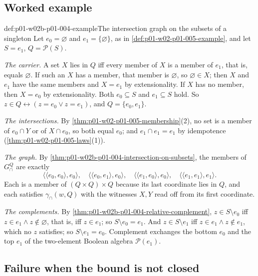 \subsection{Worked example}
\label{sec:p01-w02b-p01-004-example}

\begin{hbexample}{def:p01-w02b-p01-004-example}{The intersection graph on the subsets of a singleton}
Let \(e_0=\varnothing\) and \(e_1=\{\varnothing\}\), as in
\cref{def:p01-w02-p01-005-example}, and let \(S=e_1\), \(Q=\mathcal P(S)\).

\emph{The carrier.} A set \(X\) lies in \(Q\) iff every member of \(X\) is a
member of \(e_1\), that is, equals \(\varnothing\). If such an \(X\) has a
member, that member is \(\varnothing\), so \(\varnothing\in X\); then \(X\) and
\(e_1\) have the same members and \(X=e_1\) by extensionality. If \(X\) has no
member, then \(X=e_0\) by extensionality. Both \(e_0\subseteq S\) and
\(e_1\subseteq S\) hold. So \(z\in Q\leftrightarrow(z=e_0\lor z=e_1)\), and
\(Q=\{e_0,e_1\}\).

\emph{The intersections.} By \cref{thm:p01-w02-p01-005-membership}(2), no set
is a member of \(e_0\cap Y\) or of \(X\cap e_0\), so both equal \(e_0\); and
\(e_1\cap e_1=e_1\) by idempotence (\cref{thm:p01-w02-p01-005-laws}(1)).

\emph{The graph.} By \cref{thm:p01-w02b-p01-004-intersection-on-subsets}, the
members of \(G^{Q}_{\cap}\) are exactly
\[
  \langle\langle e_0,e_0\rangle,e_0\rangle,\quad
  \langle\langle e_0,e_1\rangle,e_0\rangle,\quad
  \langle\langle e_1,e_0\rangle,e_0\rangle,\quad
  \langle\langle e_1,e_1\rangle,e_1\rangle .
\]
Each is a member of \((Q\times Q)\times Q\) because its last coordinate lies in
\(Q\), and each satisfies \(\gamma_{\cap}(w,Q)\) with the witnesses \(X,Y\)
read off from its first coordinate.

\emph{The complements.} By \cref{thm:p01-w02b-p01-004-relative-complement},
\(z\in S\setminus e_0\) iff \(z\in e_1\land z\notin\varnothing\), that is, iff
\(z\in e_1\); so \(S\setminus e_0=e_1\). And \(z\in S\setminus e_1\) iff
\(z\in e_1\land z\notin e_1\), which no \(z\) satisfies; so
\(S\setminus e_1=e_0\). Complement exchanges the bottom \(e_0\) and the top
\(e_1\) of the two-element Boolean algebra \(\mathcal P(e_1)\).
\end{hbexample}

\subsection{Failure when the bound is not closed}
\label{sec:p01-w02b-p01-004-failure}

